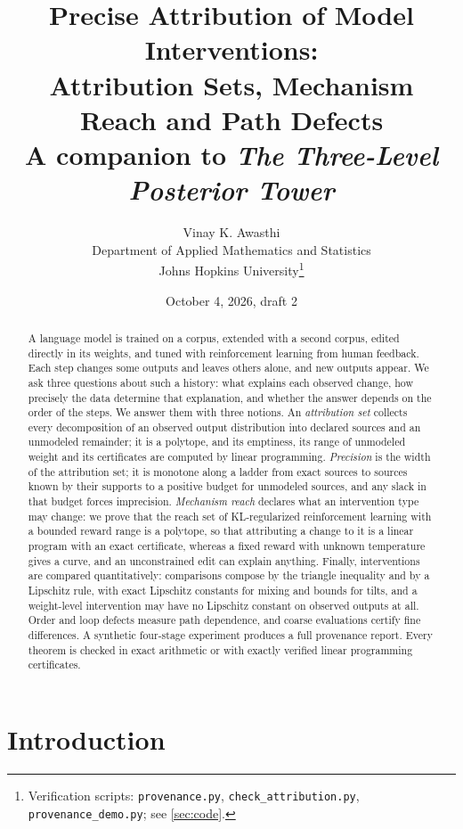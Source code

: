 \documentclass[11pt]{article}
\title{Precise Attribution of Model Interventions:\\
Attribution Sets, Mechanism Reach and Path Defects\\[4pt]
\large A companion to \emph{The Three-Level Posterior Tower}}
\author{Vinay K. Awasthi\\
Department of Applied Mathematics and Statistics\\
Johns Hopkins University\thanks{Verification scripts: \texttt{provenance.py},
\texttt{check\_attribution.py}, \texttt{provenance\_demo.py}; see \cref{sec:code}.}}
\date{October 4, 2026, draft 2}
\theoremstyle{definition}
\theoremstyle{remark}
\begin{document}
\maketitle

\begin{abstract}
A language model is trained on a corpus, extended with a second corpus, edited directly in its
weights, and tuned with reinforcement learning from human feedback. Each step changes some outputs
and leaves others alone, and new outputs appear. We ask three questions about such a history: what
explains each observed change, how precisely the data determine that explanation, and whether the
answer depends on the order of the steps. We answer them with three notions. An \emph{attribution
set} collects every decomposition of an observed output distribution into declared sources and an
unmodeled remainder; it is a polytope, and its emptiness, its range of unmodeled weight and its
certificates are computed by linear programming. \emph{Precision} is the width of the attribution
set; it is monotone along a ladder from exact sources to sources known by their supports to a
positive budget for unmodeled sources, and any slack in that budget forces imprecision.
\emph{Mechanism reach} declares what an intervention type may change: we prove that the reach set of
KL-regularized reinforcement learning with a bounded reward range is a polytope, so that attributing
a change to it is a linear program with an exact certificate, whereas a fixed reward with unknown
temperature gives a curve, and an unconstrained edit can explain anything. Finally, interventions are
compared quantitatively: comparisons compose by the triangle inequality and by a Lipschitz rule, with
exact Lipschitz constants for mixing and bounds for tilts, and a weight-level intervention may have no
Lipschitz constant on observed outputs at all. Order and loop defects measure path dependence, and
coarse evaluations certify fine differences. A synthetic four-stage experiment produces a full
provenance report. Every theorem is checked in exact arithmetic or with exactly verified linear
programming certificates.
\end{abstract}

\tableofcontents

\section{Introduction}\label{sec:intro}
\end{document}
